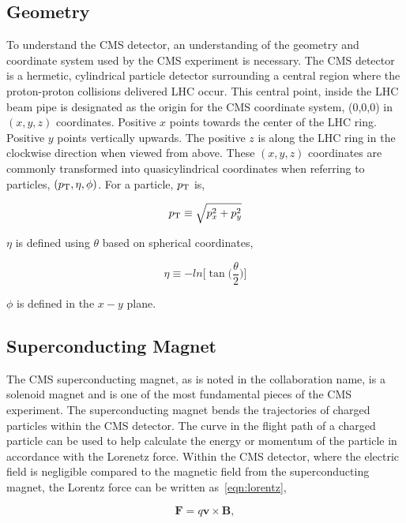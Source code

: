 \subsection{Geometry}
To understand the CMS detector, an understanding of the geometry and coordinate system used by the 
CMS experiment is necessary. The CMS detector is a hermetic, cylindrical particle detector surrounding
a central region where the proton-proton collisions delivered LHC occur. This central
point, inside the LHC beam pipe is designated as the origin for the CMS coordinate system, (0,0,0) in
$(x, y, z)$ coordinates. Positive $x$ points towards the center of the LHC ring.
Positive $y$ points vertically upwards. The positive $z$ is along the LHC ring in the
clockwise direction when viewed from above. These $(x, y, z)$ coordinates are commonly transformed
into quasicylindrical coordinates when referring to particles, $(p_\mathrm{T}, \eta, \phi)$. For a particle,
$p_\mathrm{T}$ is,

\begin{equation}
p_\mathrm{T} \equiv \sqrt{p^{2}_{x} + p^{2}_{y}}
\end{equation}

$\eta$ is defined using $\theta$ based on spherical coordinates,

\begin{equation}
\eta \equiv -ln\bigg[\tan\bigg(\frac{\theta}{2}\bigg)\bigg]
\end{equation}

$\phi$ is defined in the $x-y$ plane.



\subsection{Superconducting Magnet}
The CMS superconducting magnet, as is noted in the collaboration name, is 
a solenoid magnet and is one of the most fundamental
pieces of the CMS experiment. The superconducting magnet bends the trajectories of charged particles
within the CMS detector. The curve in the flight path of a charged particle can be used to help
calculate the energy or momentum of the particle in accordance with the Lorenetz force.
Within the CMS detector, where the electric field is negligible compared to the magnetic field
from the superconducting magnet, the Lorentz force can be written as~\ref{eqn:lorentz},

\begin{equation}
\textbf{F} = q\textbf{v} \times \textbf{B},
\label{eqn:lorentz}
\end{equation}

